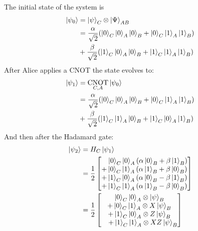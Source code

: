 \documentclass[prx,twocolumn]{revtex4-2}
\numberwithin{equation}{section}
\numberwithin{figure}{section}
\numberwithin{table}{section}
\DeclareMathOperator{\CNOT}{CNOT}
\begin{document}
The initial state of the system is 
\begin{equation}
    \begin{aligned}
    \ket{\psi_0}    &= \ket\psi_C \otimes \ket\Psi_{AB} \\
                    &= \frac{\alpha}{\sqrt2} (\ket0_C\ket0_A\ket0_B + \ket0_C\ket1_A\ket1_B) \\
                    &+ \frac{\beta}{\sqrt2} (\ket1_C\ket0_A\ket0_B + \ket1_C\ket1_A\ket1_B)
    \end{aligned}
\end{equation}
After Alice applies a CNOT the state evolves to:
\begin{equation}
    \begin{aligned}
    \ket{\psi_1}    &= \CNOT_{C,A} \ket{\psi_0} \\
                    &= \frac{\alpha}{\sqrt2} (\ket0_C\ket0_A\ket0_B + \ket0_C\ket1_A\ket1_B) \\ 
                    &+ \frac{\beta}{\sqrt2} (\ket1_C\ket1_A\ket0_B + \ket1_C\ket0_A\ket1_B)
    \end{aligned} 
\end{equation}
And then after the Hadamard gate:
\begin{equation}
    \begin{aligned}
    \ket{\psi_2}    &= H_C \ket{\psi_1} \\
                    &= \frac{1}{2}
                        \begin{bmatrix}
                        \quad \ket0_C\ket0_A (\alpha\ket0_B+\beta\ket1_B) \\
                        +\ket0_C\ket1_A (\alpha\ket1_B+\beta\ket0_B) \\
                        +\ket1_C\ket0_A (\alpha\ket0_B-\beta\ket1_B) \\
                        +\ket1_C\ket1_A (\alpha\ket1_B-\beta\ket0_B)     
                        \end{bmatrix} \\
                    &= \frac{1}{2} 
                    \begin{bmatrix}
                        \ket0_C\ket0_A \otimes \ket\psi_B \\
                        +\ket0_C\ket1_A \otimes X\ket\psi_B \\
                        +\ket1_C\ket0_A \otimes Z\ket\psi_B \\ 
                        \quad +\ket1_C\ket1_A \otimes XZ\ket\psi_B 
                    \end{bmatrix}
    \end{aligned}
    \label{eq:psi-2}
\end{equation}
\end{document}
